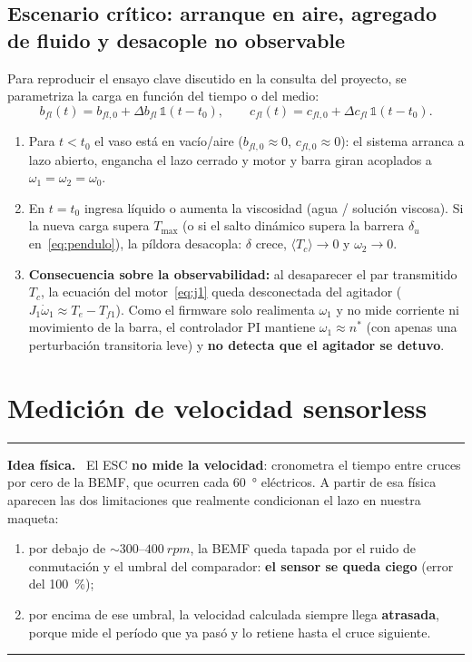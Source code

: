 \documentclass[11pt,a4paper,oneside]{report}
\theoremstyle{definition}
\theoremstyle{remark}
\newenvironment{idea}%
  {\par\medskip\noindent\begin{minipage}{\linewidth}\hrule\smallskip
   \noindent\textbf{Idea física.}\ }%
  {\smallskip\hrule\end{minipage}\par\medskip}
\begin{document}
\section{Escenario crítico: arranque en aire, agregado de fluido y desacople no observable}
\label{sec:aire_agua}
Para reproducir el ensayo clave discutido en la consulta del proyecto, se
parametriza la carga en función del tiempo o del medio:
\begin{equation}
  b_{fl}(t) = b_{fl,0} + \Delta b_{fl}\,\mathbb{1}(t - t_0), \qquad
  c_{fl}(t) = c_{fl,0} + \Delta c_{fl}\,\mathbb{1}(t - t_0).
\end{equation}
\begin{enumerate}
  \item Para $t < t_0$ el vaso está en vacío/aire ($b_{fl,0}\approx 0$,
        $c_{fl,0}\approx 0$): el sistema arranca a lazo abierto, engancha el
        lazo cerrado y motor y barra giran acoplados a $\omega_1=\omega_2=\omega_0$.
  \item En $t = t_0$ ingresa líquido o aumenta la viscosidad (agua / solución
        viscosa). Si la nueva carga supera $T_{\max}$ (o si el salto dinámico
        supera la barrera $\delta_u$ en~\eqref{eq:pendulo}), la píldora
        desacopla: $\delta$ crece, $\langle T_c\rangle \to 0$ y $\omega_2 \to 0$.
  \item \textbf{Consecuencia sobre la observabilidad:} al desaparecer el par
        transmitido $T_c$, la ecuación del motor~\eqref{eq:j1} queda
        desconectada del agitador ($J_1\dot\omega_1 \approx T_e - T_{f1}$). Como
        el firmware solo realimenta $\omega_1$ y no mide corriente ni movimiento
        de la barra, el controlador PI mantiene $\omega_1 \approx n^\ast$ (con
        apenas una perturbación transitoria leve) y \textbf{no detecta que el
        agitador se detuvo}.
\end{enumerate}

\chapter{Medición de velocidad sensorless}\label{cap:medicion}

\begin{idea}
El ESC \textbf{no mide la velocidad}: cronometra el tiempo entre cruces por cero
de la BEMF, que ocurren cada \SI{60}{\degree} eléctricos. A partir de esa
física aparecen las dos limitaciones que realmente condicionan el lazo en
nuestra maqueta:
\begin{enumerate}
  \item por debajo de $\sim 300\text{--}\SI{400}{rpm}$, la BEMF queda tapada por
        el ruido de conmutación y el umbral del comparador: \textbf{el sensor se
        queda ciego} (error del \SI{100}{\percent});
  \item por encima de ese umbral, la velocidad calculada siempre llega
        \textbf{atrasada}, porque mide el período que ya pasó y lo retiene
        hasta el cruce siguiente.
\end{enumerate}
\end{idea}
\end{document}
